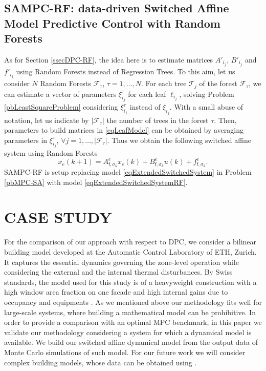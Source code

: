 \documentclass[]{ifacconf}  %
\begin{document}
\subsection{SAMPC-RF: data-driven Switched Affine Model Predictive Control with Random Forests}\label{ssecSAMPC-RF}
As for Section \ref{ssecDPC-RF}, the idea here is to estimate matrices $A'_{i_j}$, $B'_{i_j}$ and $f'_{i_j}$ using Random Forests instead of Regression Trees.
To this aim, let us consider $N$ Random Forests $\mathcal{F}_\tau$, $\tau = 1,\ldots,N$. 
For each tree $\mathcal{T}_j$ of the forest $\mathcal{F}_\tau$, we can estimate a vector of parameters $\xi_{i_j}^\tau$ for each leaf $\ell_{i_j}$, solving Problem \ref{pbLeastSquareProblem} considering $\xi_{i_j}^\tau$ instead of $\xi_{i_j}$.
With a small abuse of notation, let us indicate by $|\mathcal{F}_\tau|$ the number of trees in the forest $\tau$. 
Then, parameters to build matrices in \eqref{eqLeafModel} can be obtained by averaging parameters in $\xi_{i_j}^\tau$, $\forall j = 1,\ldots,|\mathcal{F}_\tau|$.
Thus we obtain the following switched affine system using Random Forests
\small
\begin{equation}\label{eqExtendedSwitchedSystemRF} 
x_e(k+1) = A_{\mathsf{f},\sigma_k}^e x_e(k) + B_{\mathsf{f},\sigma_k}^e u(k) + f^e_{\mathsf{f},\sigma_k}.	
\end{equation}
\normalsize
SAMPC-RF is setup replacing model \eqref{eqExtendedSwitchedSystem} in Problem \ref{pbMPC-SA} with model \eqref{eqExtendedSwitchedSystemRF}.


\section{CASE STUDY}\label{secCaseStudy}
For the comparison of our approach with respect to DPC, we consider a bilinear building model developed at the Automatic Control Laboratory of ETH, Zurich.
It captures the essential dynamics governing the zone-level operation while considering the external and the internal thermal disturbances. 
By Swiss standards, the model used for this study is of a heavyweight construction with a high window area fraction on one facade and high internal gains due to occupancy and equipments \cite{Gyalistras2010a}.
As we mentioned above our methodology fits well for large-scale systems, where building a mathematical model can be prohibitive.
In order to provide a comparison with an optimal MPC benchmark, in this paper we validate our methodology considering a system for which a dynamical model is available.
We build our switched affine dynamical model from the output data of Monte Carlo simulations of such model.
For our future work we will consider complex building models, whose data can be obtained using \cite{energyPlus}.
\end{document}
